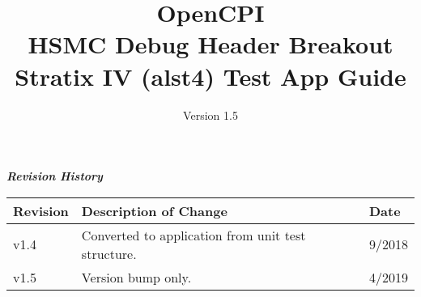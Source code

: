 \iffalse
This file is protected by Copyright. Please refer to the COPYRIGHT file
distributed with this source distribution.

This file is part of OpenCPI <http://www.opencpi.org>

OpenCPI is free software: you can redistribute it and/or modify it under the
terms of the GNU Lesser General Public License as published by the Free Software
Foundation, either version 3 of the License, or (at your option) any later
version.

OpenCPI is distributed in the hope that it will be useful, but WITHOUT ANY
WARRANTY; without even the implied warranty of MERCHANTABILITY or FITNESS FOR A
PARTICULAR PURPOSE. See the GNU Lesser General Public License for more details.

You should have received a copy of the GNU Lesser General Public License along
with this program. If not, see <http://www.gnu.org/licenses/>.
\fi

\def\docTitle{OpenCPI\\ HSMC Debug Header Breakout Stratix IV (alst4) Test App Guide}
\def\docVersion{1.5}

\date{Version \docVersion} %
\title{\docTitle}
\usepackage{graphicx}
\graphicspath{ {figures/} }
\usepackage{textcomp}
\usepackage{listings}


\maketitle

\begin{center}
  \textit{\textbf{Revision History}}
  \begin{longtable}{|p{}
                    |p{}
                    |p{}|}
    \hline
    \rowcolor{blue}
    \textbf{Revision} & \textbf{Description of Change} & \textbf{Date} \\
    \hline
    v1.4 & Converted to application from unit test structure. & 9/2018 \\
    \hline
    v1.5 & Version bump only. & 4/2019 \\
    \hline
  \end{longtable}
\end{center}

